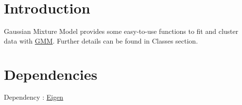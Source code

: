\hypertarget{index_intro_sec}{}\section{Introduction}\label{index_intro_sec}
Gaussian Mixture Model provides some easy-\/to-\/use functions to fit and cluster data with \hyperlink{class_g_m_m}{G\+M\+M}. Further details can be found in Classes section.\hypertarget{index_depend_sec}{}\section{Dependencies}\label{index_depend_sec}
Dependency \+: \hyperlink{namespace_eigen}{Eigen} 